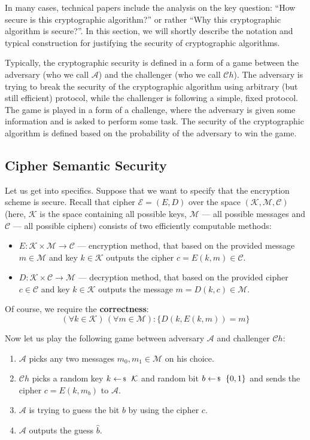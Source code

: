 \documentclass[../lecture-notes-148x210.tex]{subfiles}
\begin{document}
In many cases, technical papers include the analysis on the key question: ``How secure is this cryptographic algorithm?'' or rather ``Why this cryptographic algorithm is secure?''. In this section, we will shortly describe the notation and typical construction for justifying the security of cryptographic algorithms.

Typically, the cryptographic security is defined in a form of a game between the adversary (who we call $\mathcal{A}$) and the challenger (who we call $\mathcal{C}h$). The adversary is trying to break the security of the cryptographic algorithm using arbitrary (but still efficient) protocol, while the challenger is following a simple, fixed protocol. The game is played in a form of a challenge, where the adversary is given some information and is asked to perform some task. The security of the cryptographic algorithm is defined based on the probability of the adversary to win the game.

\subsection{Cipher Semantic Security}
Let us get into specifics. Suppose that we want to specify that the encryption scheme is secure. Recall that 
cipher $\mathcal{E} = (E,D)$ over the space $(\mathcal{K}, \mathcal{M}, \mathcal{C})$ (here, $\mathcal{K}$ is 
the space containing all possible keys, $\mathcal{M}$ --- all possible messages and $\mathcal{C}$ --- all 
possible ciphers) consists of two efficiently computable methods:
\begin{itemize}
    \item $E: \mathcal{K} \times \mathcal{M} \to \mathcal{C}$ --- encryption method, that based on the provided message $m \in \mathcal{M}$ and key $k \in \mathcal{K}$ outputs the cipher $c = E(k,m) \in \mathcal{C}$.
    \item $D: \mathcal{K} \times \mathcal{C} \to \mathcal{M}$ --- decryption method, that based on the provided cipher $c \in \mathcal{C}$ and key $k \in \mathcal{K}$ outputs the message $m = D(k,c) \in \mathcal{M}$.
\end{itemize}

Of course, we require the \textbf{correctness}:
\begin{equation*}
    (\forall k \in \mathcal{K}) \, (\forall m \in \mathcal{M}): \{D(k,E(k,m)) = m\}
\end{equation*}

Now let us play the following game between adversary $\mathcal{A}$ and challenger $\mathcal{C}h$:
\begin{enumerate}
    \item $\mathcal{A}$ picks any two messages $m_0,m_1 \in \mathcal{M}$ on his choice.
    \item $\mathcal{C}h$ picks a random key $k \leftarrowS \mathcal{K}$ and random bit $b \leftarrowS \{0,1\}$ and sends the cipher $c = E(k,m_b)$ to $\mathcal{A}$.
    \item $\mathcal{A}$ is trying to guess the bit $b$ by using the cipher $c$.
    \item $\mathcal{A}$ outputs the guess $\hat{b}$.
\end{enumerate}
\end{document}
